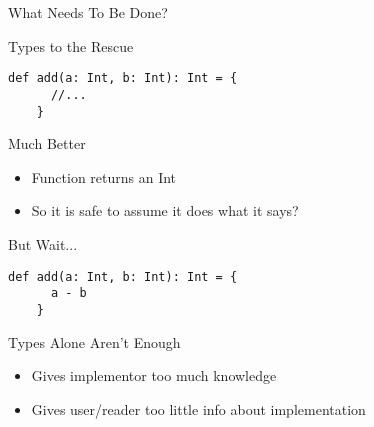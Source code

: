 \begin{section}{What Needs To Be Done?}
\begin{frame}[fragile]{Types to the Rescue}
  \begin{lstlisting}[style=scala]
    def add(a: Int, b: Int): Int = {
      //...
    }
  \end{lstlisting}
\end{frame}

\begin{frame}[fragile]{Much Better}
  \begin{itemize}
  \item Function returns an Int
  \item So it is safe to assume it does what it says?
  \end{itemize}
\end{frame}

\begin{frame}[fragile]{But Wait...}
  \begin{lstlisting}[style=scala]
    def add(a: Int, b: Int): Int = {
      a - b
    }
  \end{lstlisting}
\end{frame}

\begin{frame}[fragile]{Types Alone Aren't Enough}
  \begin{itemize}
  \item Gives implementor too much knowledge
  \item Gives user/reader too little info about implementation
  \end{itemize}
\end{frame}

\end{section}
